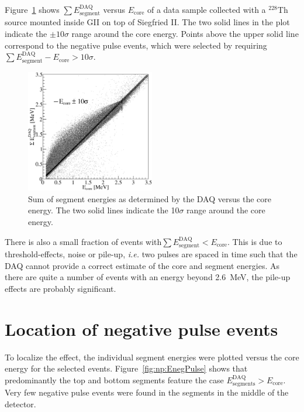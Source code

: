 Figure~\ref{fig:np:sEnegPulse} shows $\sum
E^{\text{DAQ}}_{\text{segment}}$ versus $E_{\text{core}}$ of a data
sample collected with a $^{228}$Th source mounted inside GII on top of
Siegfried II. The two solid lines in the plot indicate the $\pm 10
\sigma$ range around the core energy. Points above the upper solid
line correspond to the negative pulse events, which were selected by
requiring $\sum E^{\text{DAQ}}_{\text{segment}} - E_{\text{core}} >
10\sigma$.

\begin{figure}[tphb]
\centering
\includegraphics[width=0.5\textwidth]{sEnegPuls}
\caption{Sum of segment energies as determined by the DAQ versus the
core energy. The two solid lines indicate the 10$\sigma$ range around
the core energy.}
\label{fig:np:sEnegPulse}
\end{figure}

There is also a small fraction of events with$\sum
E^{\text{DAQ}}_{\text{segment}} < E_{\text{core}}$. This is due to
threshold-effects, noise or pile-up, \textit{i.e.} two pulses are
spaced in time such that the DAQ cannot provide a correct estimate of
the core and segment energies. As there are quite a number of events
with an energy beyond 2.6~MeV, the pile-up effects are probably
significant.

\section{Location of negative pulse events}
\label{sec:np:locneg}
To localize the effect, the individual segment energies were plotted
versus the core energy for the selected
events. Figure~\ref{fig:np:EnegPulse} shows that predominantly the top
and bottom segments feature the case $E^{\text{DAQ}}_{\text{segments}} >
E_{\text{core}}$. Very few negative pulse events were found in the
segments in the middle of the detector.
 
